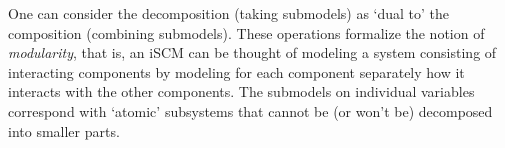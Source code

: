 One can consider the decomposition (taking submodels) as `dual to' the composition (combining submodels).
These operations formalize the notion of \emph{modularity}, that is, an iSCM can be thought of modeling a system consisting of interacting components by modeling for each component separately how it interacts with the other components.
The submodels on individual variables correspond with `atomic' subsystems that cannot be (or won't be) decomposed into smaller parts.
